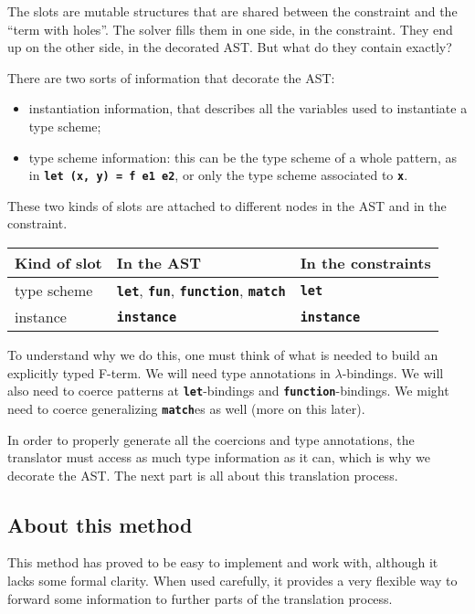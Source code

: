 \documentclass[10pt,a4paper,twoside,titlepage,twocolumn]{article}
\newcommand{\code}[1]{\textbf{\texttt{#1}}}
\begin{document}
The slots are mutable structures that are shared between the constraint and the
``term with holes''. The solver fills them in one side, in the constraint. They
end up on the other side, in the decorated AST. But what do they contain
exactly?

There are two sorts of information that decorate the AST:
\begin{itemize}
  \item instantiation information, that describes all the variables used to
    instantiate a type scheme;
  \item type scheme information: this can be the type scheme of a whole pattern,
    as in \code{let (x, y) = f e1 e2}, or only the type scheme associated to
    \code{x}.
\end{itemize}

These two kinds of slots are attached to different nodes in the AST and in the
constraint.

\begin{center}
  \begin{tabular}{l|p{2.5cm}|l}
    \textbf{Kind of slot} & \textbf{In the AST} & \textbf{In the constraints} \\
    \hline
    type scheme & \code{let}, \code{fun}, \code{function}, \code{match} & \code{let} \\
    \hline
    instance    & \code{instance} & \code{instance}
  \end{tabular}
\end{center}

To understand why we do this, one must think of what is needed to build an
explicitly typed F-term. We will need type annotations in $\lambda$-bindings. We
will also need to coerce patterns at \code{let}-bindings and
\code{function}-bindings.  We might need to coerce generalizing \code{match}es
as well (more on this later).

In order to properly generate all the coercions and type annotations, the
translator must access as much type information as it can, which is why we
decorate the AST. The next part is all about this translation process.

\subsection{About this method}

This method has proved to be easy to implement and work with, although it lacks
some formal clarity. When used carefully, it provides a very flexible way to
forward some information to further parts of the translation process.
\end{document}

